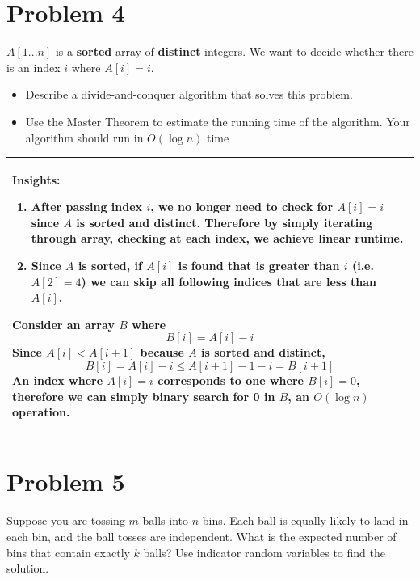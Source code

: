 \documentclass[10pt]{article}
\newenvironment{answer}
    {\begin{center}
    \begin{tabular}{|p{1\textwidth}|}
    \hline
    }
    { 
    \\\hline
    \end{tabular} 
    \end{center}
    }
\begin{document}
\section*{Problem 4}
$A[1...n]$ is a \textbf{sorted} array of \textbf{distinct} integers. We want to decide whether there is an index $i$ where $A[i] = i$.

\begin{itemize}
\item Describe a divide-and-conquer algorithm that solves this problem.
\item Use the Master Theorem to estimate the running time of the algorithm. Your algorithm should run in $O(\log n)$ time
\end{itemize}

\begin{answer}
  Insights:
  \begin{enumerate}
  \item After passing index $i$, we no longer need to check for $A[i] = i$ since $A$ is sorted and distinct. Therefore by simply iterating through array, checking at each index, we achieve linear runtime.
  \item Since $A$ is sorted, if $A[i]$ is found that is greater than $i$ (i.e. $A[2] = 4$) we can skip all following indices that are less than $A[i]$.
  \end{enumerate}

  Consider an array $B$ where 
  \[ B[i] = A[i] -i \]
  Since $A[i] < A[i+1]$ because $A$ is sorted and distinct, 
  \[ B[i] = A[i] - i \le A[i+1] - 1 - i = B[i+1] \]
  An index where $A[i] = i$ corresponds to one where $B[i] = 0$, therefore we can simply binary search for 0 in $B$, an $O(\log n)$ operation.
\end{answer}

\section*{Problem 5}
Suppose you are tossing $m$ balls into $n$ bins. Each ball is equally likely to land in each bin, and the ball tosses are independent. What is the expected number of bins that contain exactly $k$ balls? Use indicator random variables to find the solution.
\end{document}
